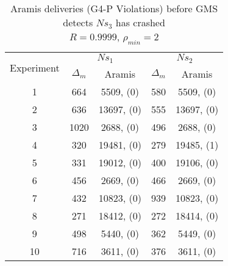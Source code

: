 \begin{table}[p]
    \begin{center}
        \renewcommand{\arraystretch}{1.25}
        \begin{tabular}{|c|c|c|c|c|}
            \hline
            \multirow{2}{*}{Experiment} & \multicolumn{2}{|c|}{$Ns_1$} & \multicolumn{2}{|c|}{$Ns_2$} \\ \cline{2-5}
                                                       & $\Delta_m$&\textsf{Aramis} & $\Delta_m$&\textsf{Aramis} \\ \hline \hline
            1 & 664 & 5509, (0) & 580 & 5509, (0) \\ \hline
            2 & 636 & 13697, (0) & 555 & 13697, (0) \\ \hline
            3 & 1020 & 2688, (0) & 496 & 2688, (0) \\ \hline
            4 & 320 & 19481, (0) & 279 & 19485, (1) \\ \hline
            5 & 331 & 19012, (0) & 400 & 19106, (0) \\ \hline
            6 & 456 & 2669, (0) & 466 & 2669, (0) \\ \hline
            7 & 432 & 10823, (0) & 939 & 10823, (0) \\ \hline
            8 & 271 & 18412, (0) & 272 & 18414, (0) \\ \hline
            9 & 498 & 5440, (0) & 362 & 5449, (0) \\ \hline
            10 & 716 & 3611, (0) & 376 & 3611, (0) \\ \hline
        \end{tabular}
        \caption{\textsf{Aramis} deliveries (G4-P Violations) before GMS detects $Ns_3$ has crashed \\ $R=0.9999$, $\rho_{min}=2$}
        \label{table:crashed_node_rho2}
    \end{center}
\end{table}

